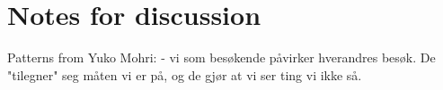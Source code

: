 \section{Notes for discussion}

Patterns from Yuko Mohri:
- vi som besøkende påvirker hverandres besøk. De "tilegner" seg måten vi er på, og de gjør at vi ser ting vi ikke så.